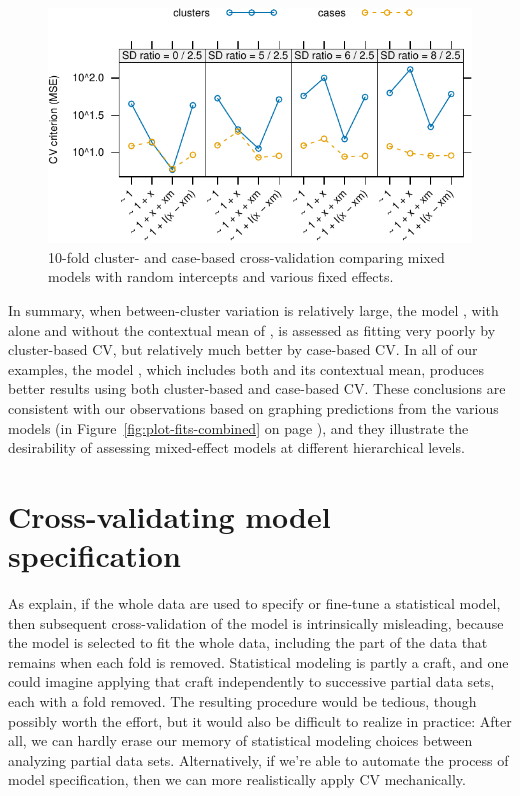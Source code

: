 \documentclass[
]{jss}
\begin{document}
\begin{CodeChunk}
\begin{figure}

{\centering \includegraphics[width=0.75\linewidth]{jss5535_files/figure-latex/cross-validation-data-plot-1}

}

\caption[10-fold cluster- and case-based cross-validation comparing mixed models with random intercepts and various fixed effects]{10-fold cluster- and case-based cross-validation comparing mixed models with random intercepts and various fixed effects.}\label{fig:cross-validation-data-plot}
\end{figure}
\end{CodeChunk}

In summary, when between-cluster variation is relatively large, the
model , with  alone and without the contextual
mean  of , is assessed as fitting very poorly by
cluster-based CV, but relatively much better by case-based CV. In all of
our examples, the model , which includes both
 and its contextual mean, produces better results using both
cluster-based and case-based CV. These conclusions are consistent with
our observations based on graphing predictions from the various models
(in Figure~\ref{fig:plot-fits-combined} on page
\pageref{fig:plot-fits-combined}), and they illustrate the desirability
of assessing mixed-effect models at different hierarchical levels.

\section{Cross-validating model
specification}\label{cross-validating-model-specification}

As \citet[Sec.~7.10.2: ``The Wrong and Right Way to Do
Cross-validation'']{HastieTibshiraniFriedman:2009} explain, if the whole
data are used to specify or fine-tune a statistical model, then
subsequent cross-validation of the model is intrinsically misleading,
because the model is selected to fit the whole data, including the part
of the data that remains when each fold is removed. Statistical modeling
is partly a craft, and one could imagine applying that craft
independently to successive partial data sets, each with a fold removed.
The resulting procedure would be tedious, though possibly worth the
effort, but it would also be difficult to realize in practice: After
all, we can hardly erase our memory of statistical modeling choices
between analyzing partial data sets. Alternatively, if we're able to
automate the process of model specification, then we can more
realistically apply CV mechanically.
\end{document}
